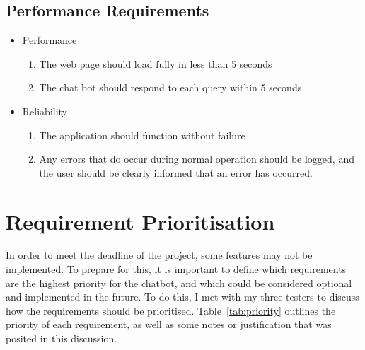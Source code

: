 \subsection{Performance Requirements}
\begin{itemize}
	\item Performance
	\begin{enumerate}[label*=P\arabic*.]
		\item The web page should load fully in less than 5 seconds
		\item The chat bot should respond to each query within 5 seconds
	\end{enumerate}
	\item Reliability
	\begin{enumerate}[resume*]
		\item The application should function without failure
		\item Any errors that do occur during normal operation should be logged, and the user should be clearly informed that an error has occurred.
	\end{enumerate}
\end{itemize}

\section{Requirement Prioritisation}
\label{sec:priority}
In order to meet the deadline of the project, some features may not be implemented. To prepare for this, it is important to define which requirements are the highest priority for the chatbot, and which could be considered optional and implemented in the future. To do this, I met with my three testers to discuss how the requirements should be prioritised. Table~\ref{tab:priority} outlines the priority of each requirement, as well as some notes or justification that was posited in this discussion.

